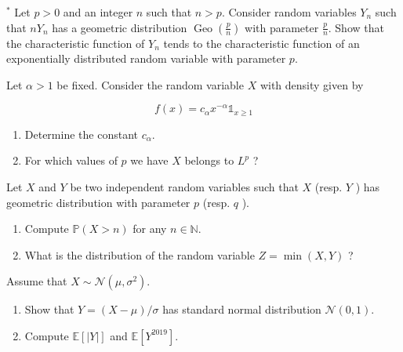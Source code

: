 \documentclass{article}
\begin{document}
\begin{Exercise} ${ }^{*}$ Let $p>0$ and an integer $n$ such that $n>p$. Consider random variables $Y_{n}$ such that $n Y_{n}$ has a geometric distribution $\operatorname{Geo}\left(\frac{p}{n}\right)$ with parameter $\frac{p}{n}$. Show that the characteristic function of $Y_{n}$ tends to the characteristic function of an exponentially distributed random variable with parameter $p$.

\end{Exercise}

\begin{Exercise} Let $\alpha>1$ be fixed. Consider the random variable $X$ with density given by

  $$
    f(x)=c_{\alpha} x^{-\alpha} \mathbb{1}_{x \geq 1}
  $$

  \begin{enumerate}
    \item Determine the constant $c_{\alpha}$.

    \item For which values of $p$ we have $X$ belongs to $L^{p}$ ?

  \end{enumerate}
\end{Exercise}

\begin{Exercise} Let $X$ and $Y$ be two independent random variables such that $X$ (resp. $Y$ ) has geometric distribution with parameter $p$ (resp. $q$ ).

  \begin{enumerate}
    \item Compute $\mathbb{P}(X>n)$ for any $n \in \mathbb{N}$.

    \item What is the distribution of the random variable $Z=\min (X, Y)$ ?

  \end{enumerate}

\end{Exercise}
\begin{Exercise} Assume that $X \sim \mathcal{N}\left(\mu, \sigma^{2}\right)$.

  \begin{enumerate}
    \item Show that $Y=(X-\mu) / \sigma$ has standard normal distribution
          $\mathcal{N}(0,1)$.

    \item Compute $\mathbb{E}[|Y|]$ and $\mathbb{E}\left[Y^{2019}\right]$.
  \end{enumerate}

\end{Exercise}
\end{document}

